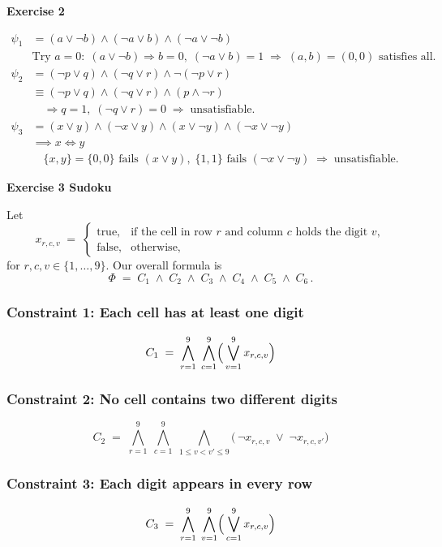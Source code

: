 \documentclass{article}
\theoremstyle{theorem}
\theoremstyle{definition}
\theoremstyle{remark}
\begin{document}
\textbf{Exercise 2}

\begin{align*}
\psi_1 &= (a\lor\neg b)\land(\neg a\lor b)\land(\neg a\lor\neg b) \\
       &\text{Try }a=0:\;(a\lor\neg b)\Rightarrow b=0,\;(\neg a\lor b)=1 
         \;\Longrightarrow\;(a,b)=(0,0)\text{ satisfies all.}
\\[1ex]
\psi_2 &= (\neg p\lor q)\land(\neg q\lor r)\land\neg(\neg p\lor r) \\
       &\equiv(\neg p\lor q)\land(\neg q\lor r)\land(p\land\neg r) \\
       &\quad\Rightarrow q=1,\;(\neg q\lor r)=0
         \;\Longrightarrow\;\text{unsatisfiable.}
\\[1ex]
\psi_3 &= (x\lor y)\land(\neg x\lor y)\land(x\lor\neg y)\land(\neg x\lor\neg y) \\
       &\implies x\iff y \\
       &\quad\{x,y\}=\{0,0\}\text{ fails }(x\lor y),\;
         \{1,1\}\text{ fails }(\neg x\lor\neg y)
         \;\Longrightarrow\;\text{unsatisfiable.}
\end{align*}

\textbf{Exercise 3 Sudoku}

Let
\[
x_{r,c,v} \;=\;
\begin{cases}
\text{true,} &\text{if the cell in row }r\text{ and column }c\text{ holds the digit }v,\\
\text{false,} &\text{otherwise},
\end{cases}
\]
for \(r,c,v\in\{1,\dots,9\}\).  Our overall formula is
\[
\Phi \;=\; C_{1}\;\land\;C_{2}\;\land\;C_{3}\;\land\;C_{4}\;\land\;C_{5}\;\land\;C_{6}\,.
\]

\subsubsection*{Constraint 1: Each cell has at least one digit}
\[
C_{1}\;=\;
\bigwedge_{r=1}^{9}\;\bigwedge_{c=1}^{9}
\Bigl(\,\bigvee_{v=1}^{9} x_{r,c,v}\Bigr)
\]

\subsubsection*{Constraint 2: No cell contains two different digits}
\[
C_{2}\;=\;
\bigwedge_{r=1}^{9}\;\bigwedge_{c=1}^{9}\;
\bigwedge_{1\le v<v'\le9}
\bigl(\,\neg x_{r,c,v}\;\lor\;\neg x_{r,c,v'}\bigr)
\]

\subsubsection*{Constraint 3: Each digit appears in every row}
\[
C_{3}\;=\;
\bigwedge_{r=1}^{9}\;\bigwedge_{v=1}^{9}
\Bigl(\,\bigvee_{c=1}^{9} x_{r,c,v}\Bigr)
\]
\end{document}
